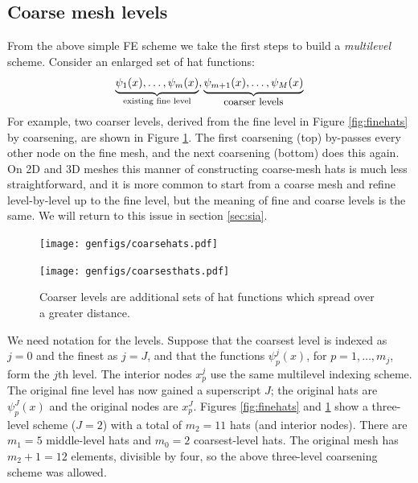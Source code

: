 \documentclass[letterpaper,final,12pt,reqno]{amsart}
\theoremstyle{claim}
\numberwithin{equation}{section}
\numberwithin{figure}{section}
\numberwithin{table}{section}
\numberwithin{theorem}{section}
\begin{document}
\subsection*{Coarse mesh levels}  From the above simple FE scheme we take the first steps to build a \emph{multilevel} scheme.  Consider an enlarged set of hat functions:
    $$\underbrace{\psi_1(x),\dots,\psi_m(x)}_{\text{existing fine level}},\underbrace{\psi_{m+1}(x),\dots,\psi_M(x)}_{\text{\small coarser levels}}$$
For example, two coarser levels, derived from the fine level in Figure \ref{fig:finehats} by coarsening, are shown in Figure \ref{fig:coarsehats}.  The first coarsening (top) by-passes every other node on the fine mesh, and the next coarsening (bottom) does this again.  On 2D and 3D meshes this manner of constructing coarse-mesh hats is much less straightforward, and it is more common to start from a coarse mesh and refine level-by-level up to the fine level, but the meaning of fine and coarse levels is the same.  We will return to this issue in section \ref{sec:sia}.

\begin{figure}
\texttt{[image: genfigs/coarsehats.pdf]}
\smallskip

\texttt{[image: genfigs/coarsesthats.pdf]}
\caption{Coarser levels are additional sets of hat functions which spread over a greater distance.}
\label{fig:coarsehats}
\end{figure}

We need notation for the levels.  Suppose that the coarsest level is indexed as $j=0$ and the finest as $j=J$, and that the functions $\psi_p^j(x)$, for $p=1,\dots,m_j$, form the $j$th level.  The interior nodes $x_p^j$ use the same multilevel indexing scheme.  The original fine level has now gained a superscript $J$; the original hats are $\psi_p^J(x)$ and the original nodes are $x_p^J$.  Figures \ref{fig:finehats} and \ref{fig:coarsehats} show a three-level scheme ($J=2$) with a total of $m_2=11$ hats (and interior nodes).  There are $m_1=5$ middle-level hats and $m_0=2$ coarsest-level hats.  The original mesh has $m_2+1=12$ elements, divisible by four, so the above three-level coarsening scheme was allowed.
\end{document}
